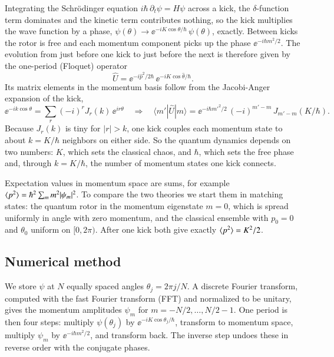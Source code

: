 Integrating the Schr\"odinger equation $i\hbar\,\partial_t\psi = H\psi$ across a kick, the
$\delta$-function term dominates and the kinetic term contributes nothing, so the kick multiplies the wave
function by a phase, $\psi(\theta) \to \ee^{-iK\cos\theta/\hbar}\,\psi(\theta)$, exactly. Between kicks the
rotor is free and each momentum component picks up the phase $\ee^{-i\hbar m^2/2}$. The evolution from just
before one kick to just before the next is therefore given by the one-period (Floquet) operator
\begin{equation}
  \hat U = \ee^{-i\hat p^2/2\hbar}\,\ee^{-iK\cos\hat\theta/\hbar}.
  \label{eq:floquet}
\end{equation}
Its matrix elements in the momentum basis follow from the Jacobi-Anger expansion of the kick,
\begin{equation}
  \ee^{-ik\cos\theta} = \sum_r (-i)^r J_r(k)\,\ee^{ir\theta}
  \quad\Longrightarrow\quad
  \langle m'|\hat U|m\rangle = \ee^{-i\hbar m'^2/2}\,(-i)^{m'-m}\,J_{m'-m}(K/\hbar).
  \label{eq:matrix_elements}
\end{equation}
Because $J_r(k)$ is tiny for $|r| > k$, one kick couples each momentum state to about $k = K/\hbar$
neighbors on either side. So the quantum dynamics depends on two numbers: $K$, which sets the classical
chaos, and $\hbar$, which sets the free phase and, through $k = K/\hbar$, the number of momentum states one
kick connects.

Expectation values in momentum space are sums, for example $\langle p^2 \rangle = \hbar^2\sum_m m^2|\psi_m|^2$. To
compare the two theories we start them in matching states: the quantum rotor in the momentum eigenstate
$m = 0$, which is spread uniformly in angle with zero momentum, and the classical ensemble with $p_0 = 0$ and
$\theta_0$ uniform on $[0, 2\pi)$. After one kick both give exactly $\langle p^2 \rangle = K^2/2$.

\subsection{Numerical method}

We store $\psi$ at $N$ equally spaced angles $\theta_j = 2\pi j/N$. A discrete Fourier transform, computed
with the fast Fourier transform (FFT) and normalized to be unitary, gives the momentum amplitudes $\psi_m$ for
$m = -N/2, \dots, N/2 - 1$. One period is then four steps:
multiply $\psi(\theta_j)$ by $\ee^{-iK\cos\theta_j/\hbar}$, transform to momentum space, multiply $\psi_m$ by
$\ee^{-i\hbar m^2/2}$, and transform back. The inverse step undoes these in reverse order with the conjugate
phases.

